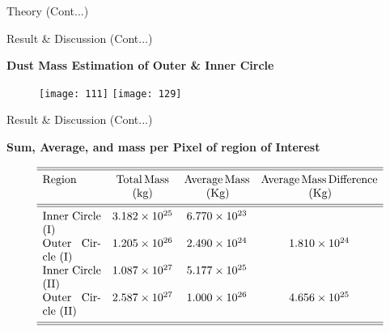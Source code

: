 \documentclass[12pt,a4paper]{beamer}
\begin{document}
\begin{frame}{Theory (Cont...)}
\begin{frame}{Result \& Discussion (Cont...)}
\begin{block}{\centering\textbf{Dust Mass Estimation of Outer \& Inner Circle \vspace*{.5cm}}}
\begin{itemize}
\begin{figure}[h]
\vspace{0.0cm} \centering
\texttt{[image: 111]}
\texttt{[image: 129]}
\end{figure}
\end{itemize}
\end{block}
\end{frame}

\begin{frame}{Result \& Discussion (Cont...)}
\begin{block}{\centering\textbf{Sum, Average, and mass per Pixel of
region of Interest \vspace*{.05cm}}}
\begin{itemize}
\begin{table}
$$
\begin{array}{p{0.15\linewidth}cccc}
            \hline
            \hline
            \noalign{\smallskip}
            Region &{\rm Total\,Mass}&{\rm Average\, Mass}&{\rm Average\, Mass\, Difference}\\
            &{\rm(kg)}&{\rm\,(Kg)}&{\rm\,(Kg)} \\
            \noalign{\smallskip}
            \hline
            \hline
            \noalign{\smallskip}
                  Inner Circle (I)  &  3.182\times10^{25}      &     6.770\times10^{23}     &  \\
                   Outer Circle (I) &  1.205\times10^{26}      &     2.490\times10^{24}     & 1.810\times10^{24}\\
                   Inner Circle (II) &  1.087\times10^{27}      &     5.177\times10^{25}    &   \\
                   Outer Circle (II) &  2.587\times10^{27}      &     1.000\times10^{26}     & 4.656\times10^{25} \\
             \noalign{\smallskip}
            \hline
            \hline
         \end{array}
     $$
\end{table}
\end{itemize}
\end{block}
\end{frame}



\end{frame}
\end{document}
